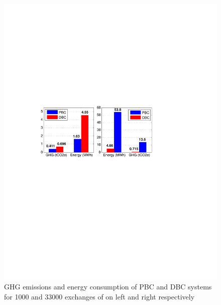 \documentclass[3p,times,procedia]{elsarticle}
\begin{document}
\begin{figure}[t]
\includegraphics[width=\linewidth]{fs.pdf}
\caption{GHG emissions and energy consumption of PBC and DBC systems for 1000 and 33000 exchanges of on left and right respectively}
\label{fig:onescore}
\endminipage\hfill
\end{figure}
\end{document}
